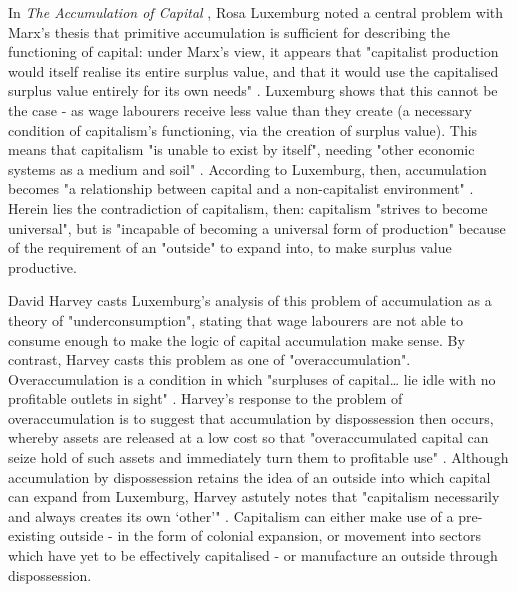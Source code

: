 In \emph{The Accumulation of Capital} \citeyearpar{luxemburg_accumulation_2015}, Rosa Luxemburg noted a central problem with Marx's thesis that primitive accumulation is sufficient for describing the functioning of capital: under Marx's view, it appears that "capitalist production would itself realise its entire surplus value, and that it would use the capitalised surplus value entirely for its own needs" \citep[p. 309]{luxemburg_accumulation_2015}. Luxemburg shows that this cannot be the case - as wage labourers receive less value than they create (a necessary condition of capitalism's functioning, via the creation of surplus value). This means that capitalism "is unable to exist by itself", needing "other economic systems as a medium and soil" \citeyearpar[p. 447]{luxemburg_accumulation_2015}. According to Luxemburg, then, accumulation becomes "a relationship between capital and a non-capitalist environment" \citeyearpar[p. 398]{luxemburg_accumulation_2015}. Herein lies the contradiction of capitalism, then: capitalism "strives to become universal", but is "incapable of becoming a universal form of production" \citeyearpar[p. 447]{luxemburg_accumulation_2015} because of the requirement of an "outside" to expand into, to make surplus value productive.

David Harvey casts Luxemburg's analysis of this problem of accumulation as a theory of "underconsumption", stating that wage labourers are not able to consume enough to make the logic of capital accumulation make sense. By contrast, Harvey casts this problem as one of "overaccumulation". Overaccumulation is a condition in which "surpluses of capital\ldots{} lie idle with no profitable outlets in sight" \citeyearpar[p. 149]{harvey_new_2003}. Harvey's response to the problem of overaccumulation is to suggest that accumulation by dispossession then occurs, whereby assets are released at a low cost so that "overaccumulated capital can seize hold of such assets and immediately turn them to profitable use" \citeyearpar[p. 149]{harvey_new_2003}. Although accumulation by dispossession retains the idea of an outside into which capital can expand from Luxemburg, Harvey astutely notes that "capitalism necessarily and always creates its own `other'" \citeyearpar[p. 141]{harvey_new_2003}. Capitalism can either make use of a pre-existing outside - in the form of colonial expansion, or movement into sectors which have yet to be effectively capitalised - or manufacture an outside through dispossession.

